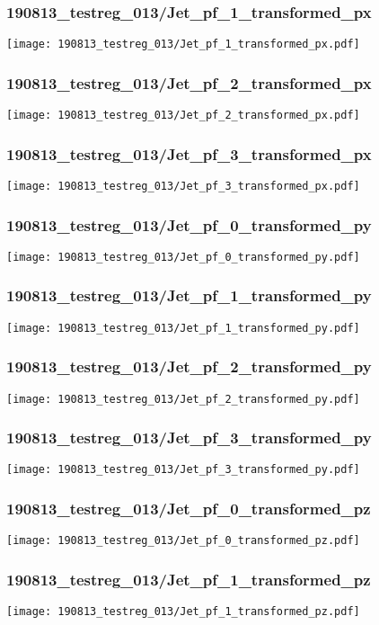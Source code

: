 \begin{frame}
   \frametitle{\small 190813\_testreg\_013/Jet\_pf\_1\_transformed\_px}
   \centering
   \texttt{[image: 190813\_testreg\_013/Jet\_pf\_1\_transformed\_px.pdf]}
\end{frame}

\begin{frame}
   \frametitle{\small 190813\_testreg\_013/Jet\_pf\_2\_transformed\_px}
   \centering
   \texttt{[image: 190813\_testreg\_013/Jet\_pf\_2\_transformed\_px.pdf]}
\end{frame}

\begin{frame}
   \frametitle{\small 190813\_testreg\_013/Jet\_pf\_3\_transformed\_px}
   \centering
   \texttt{[image: 190813\_testreg\_013/Jet\_pf\_3\_transformed\_px.pdf]}
\end{frame}

\begin{frame}
   \frametitle{\small 190813\_testreg\_013/Jet\_pf\_0\_transformed\_py}
   \centering
   \texttt{[image: 190813\_testreg\_013/Jet\_pf\_0\_transformed\_py.pdf]}
\end{frame}

\begin{frame}
   \frametitle{\small 190813\_testreg\_013/Jet\_pf\_1\_transformed\_py}
   \centering
   \texttt{[image: 190813\_testreg\_013/Jet\_pf\_1\_transformed\_py.pdf]}
\end{frame}

\begin{frame}
   \frametitle{\small 190813\_testreg\_013/Jet\_pf\_2\_transformed\_py}
   \centering
   \texttt{[image: 190813\_testreg\_013/Jet\_pf\_2\_transformed\_py.pdf]}
\end{frame}

\begin{frame}
   \frametitle{\small 190813\_testreg\_013/Jet\_pf\_3\_transformed\_py}
   \centering
   \texttt{[image: 190813\_testreg\_013/Jet\_pf\_3\_transformed\_py.pdf]}
\end{frame}

\begin{frame}
   \frametitle{\small 190813\_testreg\_013/Jet\_pf\_0\_transformed\_pz}
   \centering
   \texttt{[image: 190813\_testreg\_013/Jet\_pf\_0\_transformed\_pz.pdf]}
\end{frame}

\begin{frame}
   \frametitle{\small 190813\_testreg\_013/Jet\_pf\_1\_transformed\_pz}
   \centering
   \texttt{[image: 190813\_testreg\_013/Jet\_pf\_1\_transformed\_pz.pdf]}
\end{frame}

